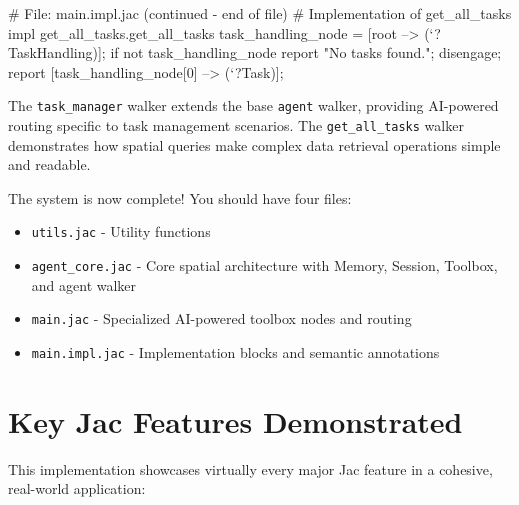 \begin{jacblock}
# File: main.impl.jac (continued - end of file)
# Implementation of get_all_tasks
impl get_all_tasks.get_all_tasks {
    task_handling_node = [root --> (`?TaskHandling)];
    if not task_handling_node {
        report "No tasks found.";
        disengage;
    }
    report [task_handling_node[0] --> (`?Task)];
}
\end{jacblock}

The \texttt{task\_manager} walker extends the base \texttt{agent} walker, providing AI-powered routing specific to task management scenarios. The \texttt{get\_all\_tasks} walker demonstrates how spatial queries make complex data retrieval operations simple and readable.

The system is now complete! You should have four files:
\begin{itemize}
\item \texttt{utils.jac} - Utility functions
\item \texttt{agent\_core.jac} - Core spatial architecture with Memory, Session, Toolbox, and agent walker
\item \texttt{main.jac} - Specialized AI-powered toolbox nodes and routing
\item \texttt{main.impl.jac} - Implementation blocks and semantic annotations
\end{itemize}

\section{Key Jac Features Demonstrated}

This implementation showcases virtually every major Jac feature in a cohesive, real-world application:

